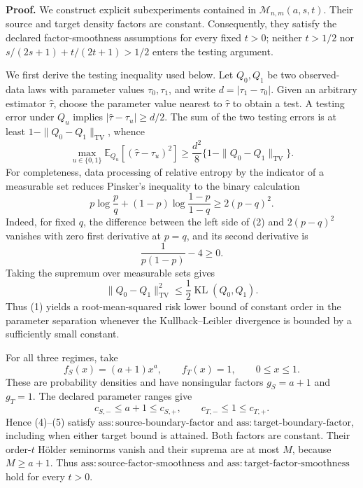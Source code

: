 \textbf{Proof.}
We construct explicit subexperiments contained in \(\mathcal M_{n,m}(a,s,t)\).  Their source and target density factors are constant.  Consequently, they satisfy the declared factor-smoothness assumptions for every fixed \(t>0\); neither \(t>1/2\) nor \(s/(2s+1)+t/(2t+1)>1/2\) enters the testing argument.

We first derive the testing inequality used below.  Let \(Q_0,Q_1\) be two observed-data laws with parameter values \(\tau_0,\tau_1\), and write \(d=|\tau_1-\tau_0|\).  Given an arbitrary estimator \(\widehat\tau\), choose the parameter value nearest to \(\widehat\tau\) to obtain a test.  A testing error under \(Q_u\) implies \(|\widehat\tau-\tau_u|\ge d/2\).  The sum of the two testing errors is at least \(1-\|Q_0-Q_1\|_{\mathrm{TV}}\), whence
\[
 \max_{u\in\{0,1\}}\mathbb E_{Q_u}
       [ (\widehat\tau-\tau_u)^2]
 \ge \frac{d^2}{8}
       \{1-\|Q_0-Q_1\|_{\mathrm{TV}}\}.
\tag{1}
\]
For completeness, data processing of relative entropy by the indicator of a measurable set reduces Pinsker's inequality to the binary calculation
\[
 p\log\frac pq+(1-p)\log\frac{1-p}{1-q}\ge 2(p-q)^2.
\tag{2}
\]
Indeed, for fixed \(q\), the difference between the left side of (2) and \(2(p-q)^2\) vanishes with zero first derivative at \(p=q\), and its second derivative is
\[
 \frac1{p(1-p)}-4\ge0.
\]
Taking the supremum over measurable sets gives
\[
 \|Q_0-Q_1\|_{\mathrm{TV}}^2
 \le \frac12\operatorname{KL}(Q_0,Q_1).
\tag{3}
\]
Thus (1) yields a root-mean-squared risk lower bound of constant order in the parameter separation whenever the Kullback--Leibler divergence is bounded by a sufficiently small constant.

For all three regimes, take
\[
 f_S(x)=(a+1)x^a,
 \qquad f_T(x)=1,
 \qquad 0\le x\le1.
\tag{4}
\]
These are probability densities and have nonsingular factors \(g_S=a+1\) and \(g_T=1\).  The declared parameter ranges give
\[
 c_{S,-}\le a+1\le c_{S,+},
 \qquad c_{T,-}\le1\le c_{T,+}.
\tag{5}
\]
Hence (4)--(5) satisfy \(\mathrm{ass:source\text{-}boundary\text{-}factor}\) and \(\mathrm{ass:target\text{-}boundary\text{-}factor}\), including when either target bound is attained.  Both factors are constant.  Their order-\(t\) H\"older seminorms vanish and their suprema are at most \(M\), because \(M\ge a+1\).  Thus \(\mathrm{ass:source\text{-}factor\text{-}smoothness}\) and \(\mathrm{ass:target\text{-}factor\text{-}smoothness}\) hold for every \(t>0\).

